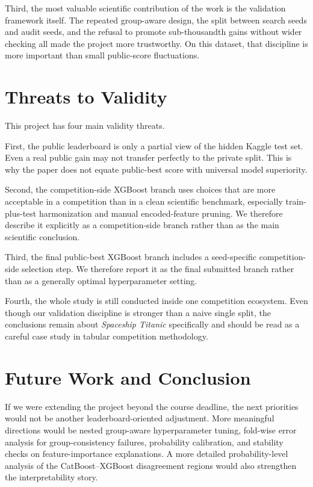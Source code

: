 \documentclass[conference]{IEEEtran}
\begin{document}
Third, the most valuable scientific contribution of the work is the validation framework itself. The repeated group-aware design, the split between search seeds and audit seeds, and the refusal to promote sub-thousandth gains without wider checking all made the project more trustworthy. On this dataset, that discipline is more important than small public-score fluctuations.

\section{Threats to Validity}
This project has four main validity threats.

First, the public leaderboard is only a partial view of the hidden Kaggle test set. Even a real public gain may not transfer perfectly to the private split. This is why the paper does not equate public-best score with universal model superiority.

Second, the competition-side XGBoost branch uses choices that are more acceptable in a competition than in a clean scientific benchmark, especially train-plus-test harmonization and manual encoded-feature pruning. We therefore describe it explicitly as a competition-side branch rather than as the main scientific conclusion.

Third, the final public-best XGBoost branch includes a seed-specific competition-side selection step. We therefore report it as the final submitted branch rather than as a generally optimal hyperparameter setting.

Fourth, the whole study is still conducted inside one competition ecosystem. Even though our validation discipline is stronger than a naive single split, the conclusions remain about \emph{Spaceship Titanic} specifically and should be read as a careful case study in tabular competition methodology.

\section{Future Work and Conclusion}
If we were extending the project beyond the course deadline, the next priorities would not be another leaderboard-oriented adjustment. More meaningful directions would be nested group-aware hyperparameter tuning, fold-wise error analysis for group-consistency failures, probability calibration, and stability checks on feature-importance explanations. A more detailed probability-level analysis of the CatBoost--XGBoost disagreement regions would also strengthen the interpretability story.
\end{document}
